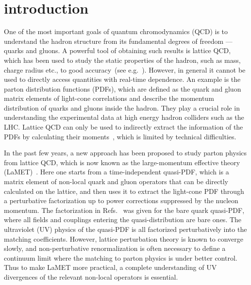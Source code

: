 \section{introduction}

One of the most important goals of quantum chromodynamics (QCD) is to understand the hadron structure from its fundamental degrees of freedom --- quarks and gluons.
A powerful tool of obtaining such results is lattice QCD, which has been used to study the static properties of the hadron, such as mass, charge radius etc., to good accuracy~(see e.g.~\cite{Edwards:2012fx,Aoki:2016frl}). However, in general it cannot be used to directly access quantities with real-time dependence. An example is the parton distribution functions (PDFs), which are defined as the quark and gluon matrix elements of light-cone correlations and describe the momentum distribution of quarks and gluons inside the hadron. They play a crucial role in understanding the experimental data at high energy hadron colliders such as the LHC. Lattice QCD can only be used to indirectly extract the information of the PDFs by calculating their moments~\cite{Detmold:2001jb,Dolgov:2002zm}, which is limited by technical difficulties.

In the past few years, a new approach has been proposed to study parton physics from lattice QCD, which is now known as the large-momentum effective theory (LaMET)~\cite{Ji:2013dva,Ji:2014gla}. Here one starts from a time-independent quasi-PDF, which is a matrix element of non-local quark and gluon operators that can be directly calculated on the lattice, and then uses it to extract the light-cone PDF through a perturbative factorization up to power corrections suppressed by the nucleon momentum. The factorization in Refs.~\cite{Ji:2013dva,Xiong:2013bka} was given for the bare quark quasi-PDF, where all fields and couplings entering the quasi-distribution are bare ones.
The ultraviolet (UV) physics of the quasi-PDF is all factorized perturbatively into the matching coefficients. However, lattice perturbation theory is known to converge slowly, and non-perturbative renormalization is often necessary to define a continuum limit where the matching to
parton physics is under better control. Thus to make LaMET more practical, a complete understanding of UV divergences of the relevant non-local operators
is essential.


